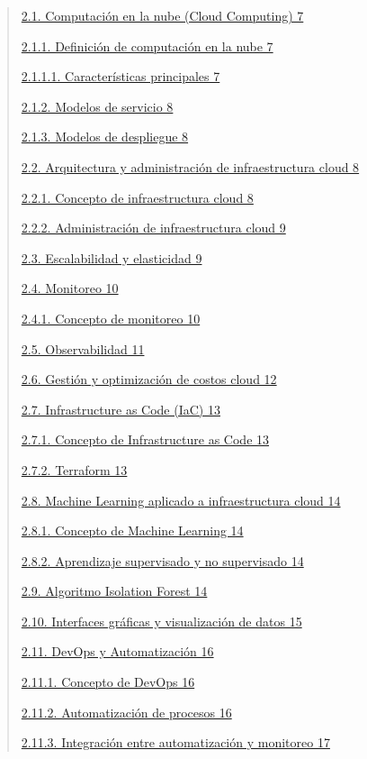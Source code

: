 \documentclass[
]{article}
\begin{document}
\begin{quote}
\hyperref[computaciuxf3n-en-la-nube-cloud-computing]{2.1. Computación en
la nube (Cloud Computing) 7}

\hyperref[definiciuxf3n-de-computaciuxf3n-en-la-nube]{2.1.1. Definición
de computación en la nube 7}

\hyperref[caracteruxedsticas-principales]{2.1.1.1. Características
principales 7}

\hyperref[modelos-de-servicio]{2.1.2. Modelos de servicio 8}

\hyperref[modelos-de-despliegue]{2.1.3. Modelos de despliegue 8}

\hyperref[arquitectura-y-administraciuxf3n-de-infraestructura-cloud]{2.2.
Arquitectura y administración de infraestructura cloud 8}

\hyperref[concepto-de-infraestructura-cloud]{2.2.1. Concepto de
infraestructura cloud 8}

\hyperref[administraciuxf3n-de-infraestructura-cloud]{2.2.2.
Administración de infraestructura cloud 9}

\hyperref[escalabilidad-y-elasticidad]{2.3. Escalabilidad y elasticidad
9}

\hyperref[monitoreo]{2.4. Monitoreo 10}

\hyperref[concepto-de-monitoreo]{2.4.1. Concepto de monitoreo 10}

\hyperref[observabilidad]{2.5. Observabilidad 11}

\hyperref[gestiuxf3n-y-optimizaciuxf3n-de-costos-cloud]{2.6. Gestión y
optimización de costos cloud 12}

\hyperref[infrastructure-as-code-iac]{2.7. Infrastructure as Code (IaC)
13}

\hyperref[concepto-de-infrastructure-as-code]{2.7.1. Concepto de
Infrastructure as Code 13}

\hyperref[terraform]{2.7.2. Terraform 13}

\hyperref[machine-learning-aplicado-a-infraestructura-cloud]{2.8.
Machine Learning aplicado a infraestructura cloud 14}

\hyperref[concepto-de-machine-learning]{2.8.1. Concepto de Machine
Learning 14}

\hyperref[aprendizaje-supervisado-y-no-supervisado]{2.8.2. Aprendizaje
supervisado y no supervisado 14}

\hyperref[algoritmo-isolation-forest]{2.9. Algoritmo Isolation Forest
14}

\hyperref[interfaces-gruxe1ficas-y-visualizaciuxf3n-de-datos]{2.10.
Interfaces gráficas y visualización de datos 15}

\hyperref[devops-y-automatizaciuxf3n]{2.11. DevOps y Automatización 16}

\hyperref[concepto-de-devops]{2.11.1. Concepto de DevOps 16}

\hyperref[automatizaciuxf3n-de-procesos]{2.11.2. Automatización de
procesos 16}

\hyperref[integraciuxf3n-entre-automatizaciuxf3n-y-monitoreo]{2.11.3.
Integración entre automatización y monitoreo 17}
\end{quote}
\end{document}
